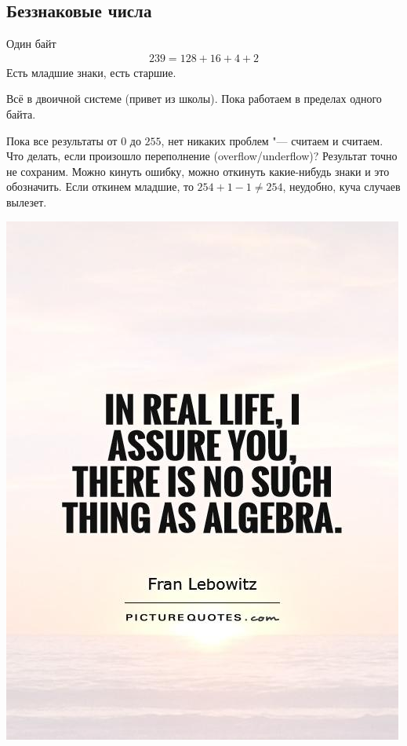 \subsection{Беззнаковые числа}

\begin{frame}
\end{frame}

\begin{frame}{Один байт}
	\begin{align*}
		239 = 128 + 16 + 4 + 2
	\end{align*}
	Есть младшие знаки, есть старшие.

	Всё в двоичной системе (привет из школы).
	Пока работаем в пределах одного байта.

	Пока все результаты от $0$ до $255$, нет никаких проблем "--- считаем и считаем.
	Что делать, если произошло переполнение (overflow/underflow)?
	Результат точно не сохраним.
	Можно кинуть ошибку, можно откинуть какие-нибудь знаки и это обозначить.
	Если откинем младшие, то $254+1-1\neq 254$, неудобно, куча случаев вылезет.
\end{frame}

\begin{frame}
	\begin{center}
		\includegraphics[scale=0.3]{will-i-use-algebra.jpg}
	\end{center}
\end{frame}


